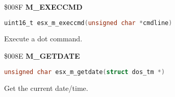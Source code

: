 \$008F \textbf{M\_EXECCMD}

\begin{lstlisting}[language=C]
uint16_t esx_m_execcmd(unsigned char *cmdline)
\end{lstlisting}

Execute a dot command.

%
%

\$008E \textbf{M\_GETDATE}

\begin{lstlisting}[language=C]
unsigned char esx_m_getdate(struct dos_tm *)
\end{lstlisting}

Get the current date/time.


